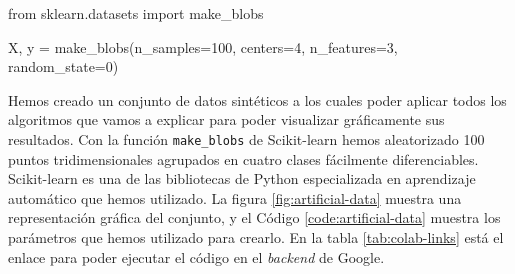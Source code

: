 \begin{mypython}[float={h}, caption={Generar datos artificiales de prueba.}, label={code:artificial-data}]
  from sklearn.datasets import make_blobs

  X, y = make_blobs(n_samples=100, centers=4,
                  n_features=3, random_state=0)
\end{mypython}

Hemos creado un conjunto de datos sintéticos a los cuales poder aplicar todos los algoritmos que vamos a explicar para poder visualizar gráficamente sus resultados. Con la función \texttt{make\_blobs} de Scikit-learn hemos aleatorizado 100 puntos tridimensionales agrupados en cuatro clases fácilmente diferenciables. Scikit-learn es una de las bibliotecas de Python especializada en aprendizaje automático que hemos utilizado. La figura \ref{fig:artificial-data} muestra una representación gráfica del conjunto, y el Código \ref{code:artificial-data} muestra los parámetros que hemos utilizado para crearlo. En la tabla \ref{tab:colab-links} está el enlace para poder ejecutar el código en el \textit{backend} de Google.

